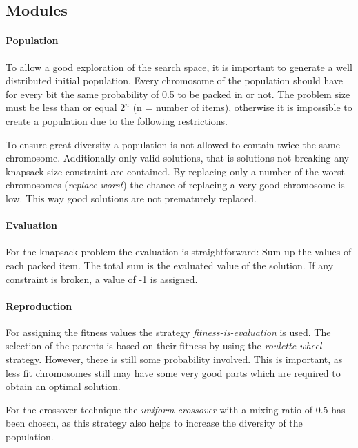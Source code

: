 \documentclass[a4paper]{article}
\begin{document}
\subsection{Modules}

\paragraph{Population} 

To allow a good exploration of the search space, it is important to generate a well distributed initial population. Every chromosome of the population should have for every bit the same probability of 0.5 to be packed in or not. The problem size must be less than or equal \(2^n\) (n = number of items), otherwise it is impossible to create a population due to the following restrictions.

To ensure great diversity a population is not allowed to contain twice the same chromosome. Additionally only valid solutions, that is solutions not breaking any knapsack size constraint are contained. By replacing only a number of the worst chromosomes (\emph{replace-worst}) the chance of replacing a very good chromosome is low. This way good solutions are not prematurely replaced.

\paragraph{Evaluation}

For the knapsack problem the evaluation is straightforward: Sum up the values of each packed item. The total sum is the evaluated value of the solution. If any constraint is broken, a value of -1 is assigned. 

\paragraph{Reproduction}

For assigning the fitness values the strategy \emph{fitness-is-evaluation} is used. The selection of the parents is based on their fitness by using the \emph{roulette-wheel} strategy. However, there is still some probability involved. This is important, as less fit chromosomes still may have some very good parts which are required to obtain an optimal solution. 

For the crossover-technique the \emph{uniform-crossover} with a mixing ratio of 0.5 has been chosen, as this strategy also helps to increase the diversity of the population. 
\end{document}
